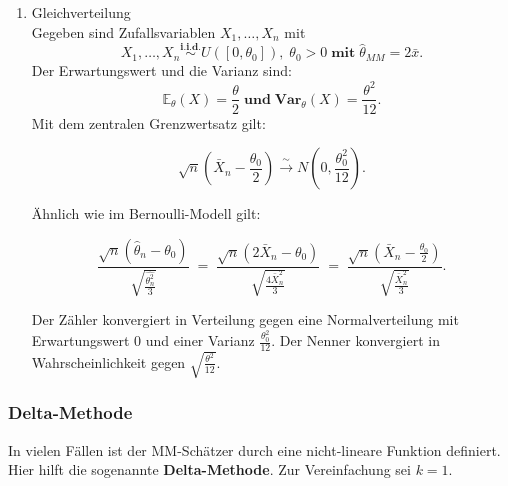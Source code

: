 \documentclass[10pt]{article}
\newcommand{\FZV}{X_1, \ldots, X_n} %
\newcommand{\EW}{\mathbb{E}} %
\newcommand{\KV}{\overset{\sim} \longrightarrow} %
\newenvironment{BSP}[1][]
{\begin{Beispiel}[frametitle=#1]}{\end{Beispiel}}
\begin{document}
\begin{BSP}[Beispiel 1.3.4 (Schätzfehlerverteilung MM-Schätzer)]
\begin{enumerate}[label = (\roman*)]
			Der erste Faktor konvergiert in Verteilung gegen eine Standardnormalverteilung und der zweite Faktor konvergiert in Wahrscheinlichkeit gegen 1 aufgrund der zuvorigen Konvergenz in Wahrscheinlichkeit. 
			
			Wegen der Rechenregeln der Konvergenz, konvergiert der gesamte Term, wie oben beschrieben, gegen eine Standardnormalverteilung. 
			Solche Prozeduren nennt man 
			$\textbf{asymptotisch valide}$.
			
			
			
			
			\item Gleichverteilung\\
			Gegeben sind Zufallsvariablen $\FZV$ mit
			\begin{equation*}
				\FZV \overset{\textbf{i.i.d.}}{\sim} U([0,\theta_0]), \; \theta_0 >0 \;\textbf{mit}\; \hat{\theta}_{MM} = 2\bar{x}.
			\end{equation*}
			Der Erwartungswert und die Varianz sind: 
			\begin{equation*}
				\EW_\theta (X) = \frac{\theta}{2} \; \textbf{und} \; \textbf{Var}_\theta (X) = \frac{\theta^2}{12}.
			\end{equation*}
			Mit dem zentralen Grenzwertsatz gilt:
			
			\begin{equation*}
				\sqrt{n} \left(\bar{X}_n - \frac{\theta_0}{2}\right) \KV N\left(0, \frac{\theta^2_0}{12}\right).
			\end{equation*}
			
			Ähnlich wie im Bernoulli-Modell gilt:
			
			\begin{equation*}
				\frac{\sqrt{n}(\hat{\theta}_n - \theta_0)}{\sqrt{\frac{\hat{\theta^2_n}}{3}}} \; = \; 
				\frac{\sqrt{n}(2 \bar{X}_n - \theta_0)}{\sqrt{\frac{4\bar{X}^2_n}{3}}} \; = \; \frac{\sqrt{n}(\bar{X}_n - \frac{\theta_0}{2})}{\sqrt{\frac{\bar{X}^2_n}{3}}}.
			\end{equation*}
			
			Der Zähler konvergiert in Verteilung gegen eine Normalverteilung mit Erwartungswert 0 und einer Varianz $\frac{\theta^2_0}{12}$. Der Nenner konvergiert in Wahrscheinlichkeit gegen $\sqrt{\frac{\theta^2}{12}}$. 
		\end{enumerate}	
	\end{BSP}

	
	
	\subsubsection{Delta-Methode}
	\noindent In vielen Fällen ist der MM-Schätzer durch eine nicht-lineare Funktion definiert. Hier hilft die sogenannte \textbf{Delta-Methode}. Zur Vereinfachung sei $k = 1$.
	
\end{document}
